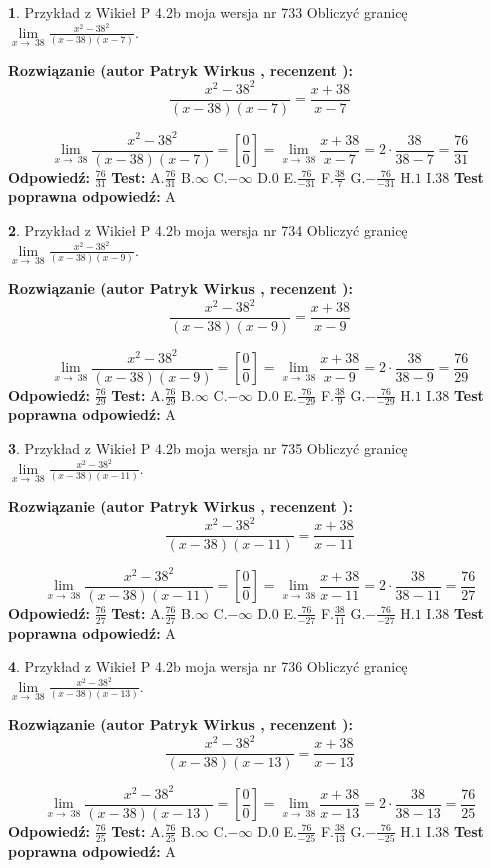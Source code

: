 \documentclass[12pt, a4paper]{article}
\theoremstyle{definition} %
\newtheorem{zad}{}
\newcommand{\zadStart}[1]{\begin{zad}#1\newline}
\newcommand{\zadStop}{\end{zad}}
\newcommand{\rozwStart}[2]{\noindent \textbf{Rozwiązanie (autor #1 , recenzent #2): }\newline}
\newcommand{\rozwStop}{\newline}
\newcommand{\odpStart}{\noindent \textbf{Odpowiedź:}\newline}
\newcommand{\odpStop}{\newline}
\newcommand{\testStart}{\noindent \textbf{Test:}\newline}
\newcommand{\testStop}{\newline}
\newcommand{\kluczStart}{\noindent \textbf{Test poprawna odpowiedź:}\newline}
\newcommand{\kluczStop}{\newline}
\begin{document}
\zadStart{Przykład z Wikieł P 4.2b moja wersja nr 733}
Obliczyć granicę $\lim\limits_{x\to\ 38}\frac{x^{2}-38^{2}}{(x-38)(x-7)}$.
\zadStop
\rozwStart{Patryk Wirkus}{}
$$\frac{x^{2}-38^{2}}{(x-38)(x-7)}=\frac{x+38}{x-7}$$

$$\lim\limits_{x\to\ 38}\frac{x^{2}-38^{2}}{(x-38)(x-7)}=[\frac{0}{0}]=\lim\limits_{x\to\ 38}\frac{x+38}{x-7}=2 \cdot \frac{38}{38-7} = \frac{76}{31}$$
\rozwStop
\odpStart
$\frac{76}{31}$
\odpStop
\testStart
A.$\frac{76}{31}$
B.$\infty$
C.$-\infty$
D.$0$
E.$\frac{76}{-31}$
F.$\frac{38}{7}$
G.$-\frac{76}{-31}$
H.$1$
I.$38$
\testStop
\kluczStart
A
\kluczStop



\zadStart{Przykład z Wikieł P 4.2b moja wersja nr 734}
Obliczyć granicę $\lim\limits_{x\to\ 38}\frac{x^{2}-38^{2}}{(x-38)(x-9)}$.
\zadStop
\rozwStart{Patryk Wirkus}{}
$$\frac{x^{2}-38^{2}}{(x-38)(x-9)}=\frac{x+38}{x-9}$$

$$\lim\limits_{x\to\ 38}\frac{x^{2}-38^{2}}{(x-38)(x-9)}=[\frac{0}{0}]=\lim\limits_{x\to\ 38}\frac{x+38}{x-9}=2 \cdot \frac{38}{38-9} = \frac{76}{29}$$
\rozwStop
\odpStart
$\frac{76}{29}$
\odpStop
\testStart
A.$\frac{76}{29}$
B.$\infty$
C.$-\infty$
D.$0$
E.$\frac{76}{-29}$
F.$\frac{38}{9}$
G.$-\frac{76}{-29}$
H.$1$
I.$38$
\testStop
\kluczStart
A
\kluczStop



\zadStart{Przykład z Wikieł P 4.2b moja wersja nr 735}
Obliczyć granicę $\lim\limits_{x\to\ 38}\frac{x^{2}-38^{2}}{(x-38)(x-11)}$.
\zadStop
\rozwStart{Patryk Wirkus}{}
$$\frac{x^{2}-38^{2}}{(x-38)(x-11)}=\frac{x+38}{x-11}$$

$$\lim\limits_{x\to\ 38}\frac{x^{2}-38^{2}}{(x-38)(x-11)}=[\frac{0}{0}]=\lim\limits_{x\to\ 38}\frac{x+38}{x-11}=2 \cdot \frac{38}{38-11} = \frac{76}{27}$$
\rozwStop
\odpStart
$\frac{76}{27}$
\odpStop
\testStart
A.$\frac{76}{27}$
B.$\infty$
C.$-\infty$
D.$0$
E.$\frac{76}{-27}$
F.$\frac{38}{11}$
G.$-\frac{76}{-27}$
H.$1$
I.$38$
\testStop
\kluczStart
A
\kluczStop



\zadStart{Przykład z Wikieł P 4.2b moja wersja nr 736}
Obliczyć granicę $\lim\limits_{x\to\ 38}\frac{x^{2}-38^{2}}{(x-38)(x-13)}$.
\zadStop
\rozwStart{Patryk Wirkus}{}
$$\frac{x^{2}-38^{2}}{(x-38)(x-13)}=\frac{x+38}{x-13}$$

$$\lim\limits_{x\to\ 38}\frac{x^{2}-38^{2}}{(x-38)(x-13)}=[\frac{0}{0}]=\lim\limits_{x\to\ 38}\frac{x+38}{x-13}=2 \cdot \frac{38}{38-13} = \frac{76}{25}$$
\rozwStop
\odpStart
$\frac{76}{25}$
\odpStop
\testStart
A.$\frac{76}{25}$
B.$\infty$
C.$-\infty$
D.$0$
E.$\frac{76}{-25}$
F.$\frac{38}{13}$
G.$-\frac{76}{-25}$
H.$1$
I.$38$
\testStop
\kluczStart
A
\kluczStop
\end{document}
